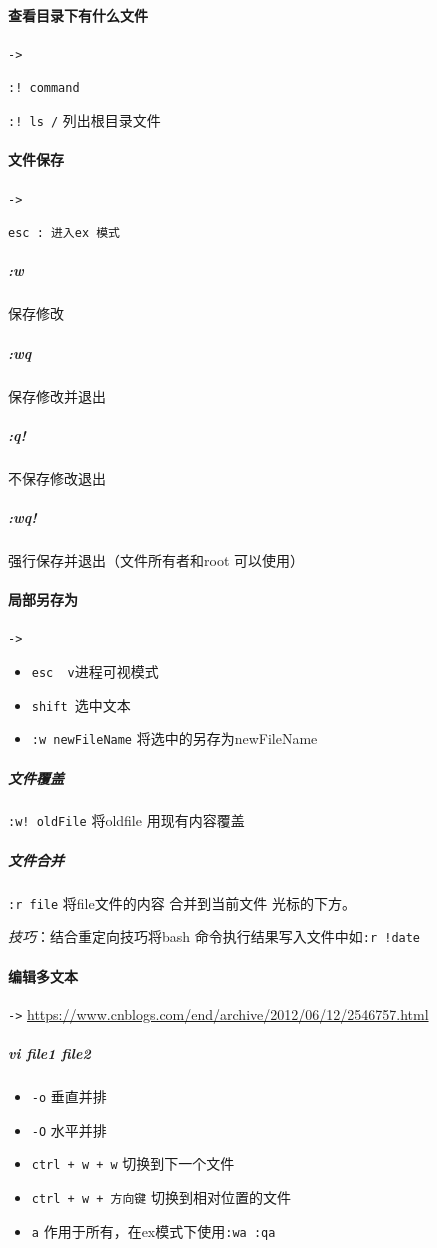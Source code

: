 \documentclass[UTF8,a4paper,12pt]{ctexbook}
\begin{document}
			\paragraph{查看目录下有什么文件}\verb|->|
			
				\verb|:! command|
				
				\verb|:! ls /| 列出根目录文件		
					
			\paragraph{文件保存}\verb|->|
			
				\verb|esc : 进入ex 模式|
				\subparagraph{:w} 保存修改
				\subparagraph{:wq} 保存修改并退出
				\subparagraph{:q!} 不保存修改退出
				\subparagraph{:wq!} 强行保存并退出（文件所有者和root 可以使用）
				
			\paragraph{局部另存为}\verb|->|
					\begin{itemize}
						\item \verb|esc  v|进程可视模式
						\item \verb|shift |选中文本
						\item \verb|:w newFileName| 将选中的另存为newFileName
					\end{itemize}			
				
				\subparagraph{文件覆盖}
					\verb|:w! oldFile| 将oldfile 用现有内容覆盖
						
						
				\subparagraph{文件合并}
					\verb|:r file| 将file文件的内容 合并到当前文件 光标的下方。
					
					\textit{技巧}：结合重定向技巧将bash 命令执行结果写入文件中如\verb|:r !date|
			\paragraph{编辑多文本}\verb|->|
				\url{https://www.cnblogs.com/end/archive/2012/06/12/2546757.html}
				\subparagraph{vi file1 file2 }
					\begin{itemize}[itemindent = 2em]
						\item \verb|-o| 垂直并排
						\item \verb|-O| 水平并排
						\item \verb|ctrl + w + w| 切换到下一个文件
						\item \verb|ctrl + w + 方向键| 切换到相对位置的文件
						\item \verb|a| 作用于所有，在ex模式下使用\verb|:wa :qa|
					\end{itemize}
				
\end{document}
